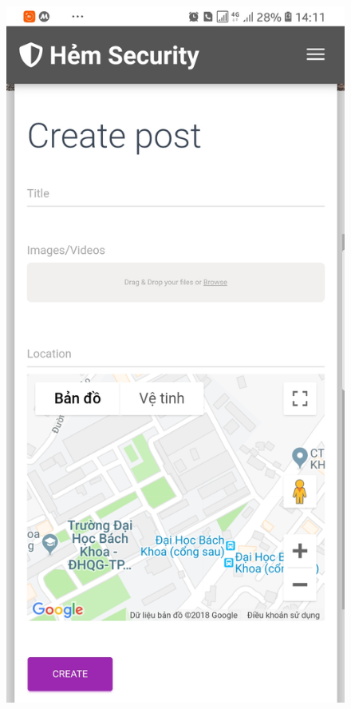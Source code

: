 \begin{figure}[!htb]
  \includegraphics[width=\linewidth]{images/chap4/create_post_mb.jpg}
\endminipage\hfill
{}

\end{figure}
